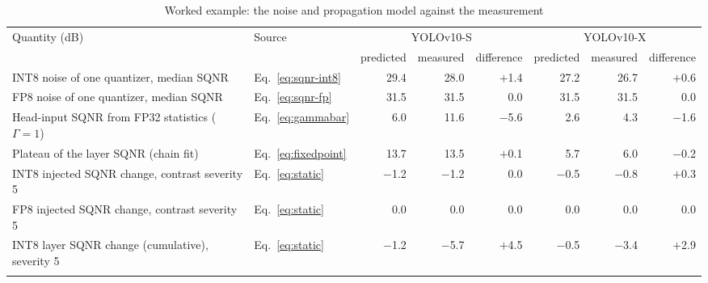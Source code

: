 \begin{table}
\footnotesize\setlength{\tabcolsep}{4pt}
\caption{Worked example: the noise and propagation model against the measurement}\label{tab:modelcheck}
\begin{tabular}{@{}llrrrrrr@{}}
\toprule
Quantity (dB) & Source & \multicolumn{3}{c}{YOLOv10-S} & \multicolumn{3}{c}{YOLOv10-X} \\
\cmidrule{3-5}\cmidrule{6-8}
 & & predicted & measured & difference & predicted & measured & difference \\
\midrule
INT8 noise of one quantizer, median SQNR & Eq.~\eqref{eq:sqnr-int8} & 29.4 & 28.0 & $+$1.4 & 27.2 & 26.7 & $+$0.6 \\
FP8 noise of one quantizer, median SQNR & Eq.~\eqref{eq:sqnr-fp} & 31.5 & 31.5 & 0.0 & 31.5 & 31.5 & 0.0 \\
Head-input SQNR from FP32 statistics ($\Gamma=1$) & Eq.~\eqref{eq:gammabar} & 6.0 & 11.6 & $-$5.6 & 2.6 & 4.3 & $-$1.6 \\
Plateau of the layer SQNR (chain fit) & Eq.~\eqref{eq:fixedpoint} & 13.7 & 13.5 & $+$0.1 & 5.7 & 6.0 & $-$0.2 \\
INT8 injected SQNR change, contrast severity 5 & Eq.~\eqref{eq:static} & $-$1.2 & $-$1.2 & 0.0 & $-$0.5 & $-$0.8 & $+$0.3 \\
FP8 injected SQNR change, contrast severity 5 & Eq.~\eqref{eq:static} & 0.0 & 0.0 & 0.0 & 0.0 & 0.0 & 0.0 \\
INT8 layer SQNR change (cumulative), severity 5 & Eq.~\eqref{eq:static} & $-$1.2 & $-$5.7 & $+$4.5 & $-$0.5 & $-$3.4 & $+$2.9 \\
\botrule
\end{tabular}
\end{table}
